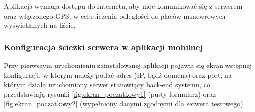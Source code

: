 \documentclass[twoside,a4paper,openright,12pt]{book}
\begin{document}
Aplikacja wymaga dostępu do Internetu, aby móc komunikować się z serwerem oraz włączonego GPS, w celu liczenia odległości do placów manewrowych wyświetlanych na liście.


\subsubsection{Konfiguracja ścieżki serwera w aplikacji mobilnej}
\label{konfiguracja_adresu_serwera}

Przy pierwszym uruchomieniu zainstalowanej aplikacji pojawia się ekran wstępnej konfiguracji, w którym należy podać adres (IP, bądź domena) oraz port, na którym działa uruchomiony serwer stanowiący back-end systemu, co przedstawiają rysunki \ref{fig:ekran_poczatkowy1} (pusty formularz) oraz \ref{fig:ekran_poczatkowy2} (wypełniony danymi zgodnymi dla serwera testowego).
\end{document}
